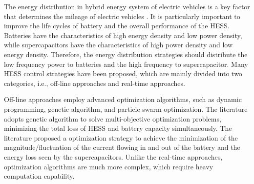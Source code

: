 \documentclass[energies,article,submit,moreauthors,pdftex,10pt,a4paper]{Definitions/mdpi}
\begin{document}
The energy distribution in hybrid energy system of electric vehicles is a key factor that determines the mileage of electric vehicles \cite{IEEEhowto:intro16}. It is particularly important to improve the life cycles of battery and the overall performance of the HESS.
Batteries have the characteristics of high energy density and low power density, while supercapacitors have the characteristics of high power density and low energy density. Therefore, the energy distribution strategies should distribute the low frequency power to batteries and the high frequency to supercapacitor.
 Many HESS control strategies have been proposed, which are mainly divided into two categories, i.e., off-line approaches and real-time approaches.
 
Off-line approaches employ advanced optimization algorithms, such as dynamic programming, genetic algorithm, and particle swarm optimization\cite{IEEEhowto:intro27,IEEEhowto:intro28,IEEEhowto:intro29}. The literature \cite{IEEEhowto:intro7} adopts genetic algorithm to solve multi-objective optimization problems, minimizing the total loss of HESS and battery capacity simultaneously. 
The literature \cite{IEEEhowto:intro26} proposed a optimization strategy to achieve the minimization of the magnitude/fluctuation of the current flowing in and out of the battery
and the energy loss seen by the supercapacitors. 
Unlike the real-time approaches, optimization algorithms are much more complex, which require heavy computation capability.
\end{document}
